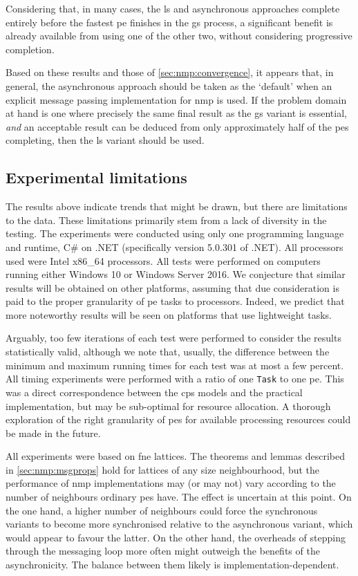 Considering that, in many cases, the \gls{ls} and asynchronous approaches complete entirely before the fastest \gls{pe} finishes in the \gls{gs} process, a significant benefit is already available from using one of the other two, without considering progressive completion.

Based on these results and those of \cref{sec:nmp:convergence}, it appears that, in general, the asynchronous approach should be taken as the `default' when an explicit message passing implementation for \gls{nmp} is used.  If the problem domain at hand is one where precisely the same final result as the \gls{gs} variant is essential, \emph{and} an acceptable result can be deduced from only approximately half of the \glspl{pe} completing, then the \gls{ls} variant should be used.

\subsection{Experimental limitations}
The results above indicate trends that might be drawn, but there are limitations to the data.  These limitations primarily stem from a lack of diversity in the testing.  The experiments were conducted using only one programming language and runtime, C\# on .NET (specifically version 5.0.301 of .NET).  All processors used were Intel x86\_64 processors.  All tests were performed on computers running either Windows 10 or Windows Server 2016.  We conjecture that similar results will be obtained on other platforms, assuming that due consideration is paid to the proper granularity of \gls{pe} tasks to processors.  Indeed, we predict that more noteworthy results will be seen on platforms that use lightweight tasks.

Arguably, too few iterations of each test were performed to consider the results statistically valid, although we note that, usually, the difference between the minimum and maximum running times for each test was at most a few percent.  All timing experiments were performed with a ratio of one \texttt{Task} to one \gls{pe}.  This was a direct correspondence between the \gls{cps} models and the practical implementation, but may be sub-optimal for resource allocation.  A thorough exploration of the right granularity of \glspl{pe} for available processing resources could be made in the future.

All experiments were based on \gls{fne} lattices.  The theorems and lemmas described in \cref{sec:nmp:msgprops} hold for lattices of any size neighbourhood, but the performance of \gls{nmp} implementations may (or may not) vary according to the number of neighbours ordinary \glspl{pe} have.  The effect is uncertain at this point.  On the one hand, a higher number of neighbours could force the synchronous variants to become more synchronised relative to the asynchronous variant, which would appear to favour the latter.  On the other hand, the overheads of stepping through the messaging loop more often might outweigh the benefits of the asynchronicity.  The balance between them likely is implementation-dependent.